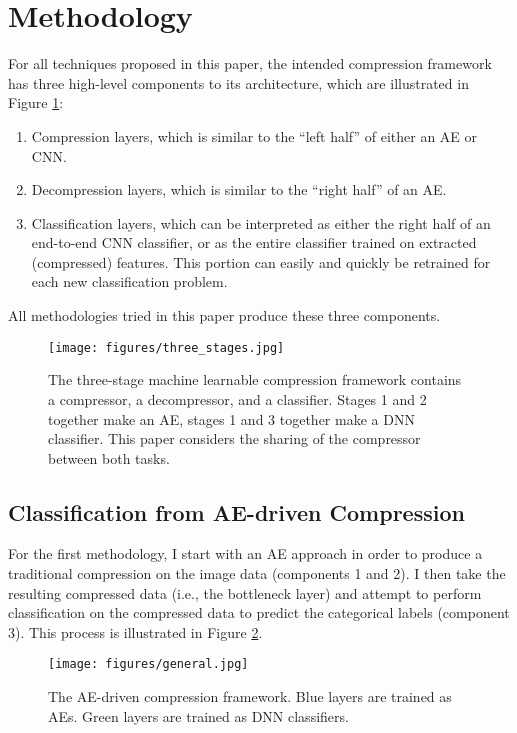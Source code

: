 \documentclass[twoside,11pt]{article}
\begin{document}
\section{Methodology} \label{fixed}

For all techniques proposed in this paper, the intended compression framework has
three high-level components to its architecture, which are
 illustrated in Figure \ref{fig:three_stages}:
\begin{enumerate}
    \item Compression layers, which is similar to the ``left half'' of either an AE or CNN. 
    \item Decompression layers, which is similar to the ``right half'' of an AE. 
    \item Classification layers, which can be interpreted as either the right half of
     an end-to-end CNN classifier, or as the entire classifier trained on extracted (compressed) features. This portion can easily and quickly be retrained for each new classification problem.
\end{enumerate}

All methodologies tried in this paper produce these three components.

\begin{figure}[h]
  \texttt{[image: figures/three\_stages.jpg]}
  \caption{The three-stage machine learnable compression framework contains a compressor, a decompressor, and a classifier. Stages 1 and 2 together make an AE, stages 1 and 3 together make a DNN classifier. This paper considers the sharing of the compressor between both tasks. }
  \label{fig:three_stages}
\end{figure}

\subsection{Classification from AE-driven Compression} \label{general}

For the first methodology, I start with an AE approach in order 
to produce a traditional compression on the image data (components 1 and 2). 
I then take the resulting compressed data (i.e., the bottleneck layer) and attempt 
to perform classification on
the compressed data to predict the categorical labels (component 3).
This process is illustrated in Figure \ref{fig:general}.

\begin{figure}[h]
  \texttt{[image: figures/general.jpg]}
  \caption{The AE-driven compression framework. Blue layers are trained as AEs. Green layers are trained as DNN classifiers.}
  \label{fig:general}
\end{figure}
\end{document}
